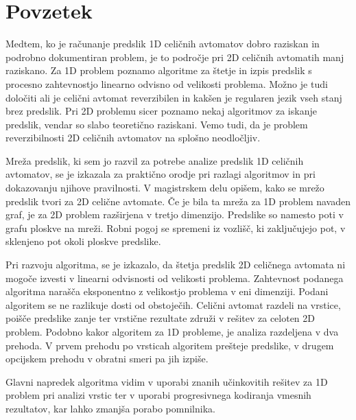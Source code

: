 \documentclass[12pt,a4paper,openany,twoside]{book}
\begin{document}

\clearpage{\pagestyle{empty}\cleardoublepage}


\setcounter{page}{1}

\chapter*{Povzetek}


Medtem, ko je računanje predslik 1D celičnih avtomatov dobro raziskan in
podrobno dokumentiran problem, je to področje pri 2D celičnih avtomatih manj raziskano.
Za 1D problem poznamo algoritme za štetje in izpis predslik s
procesno zahtevnostjo linearno odvisno od velikosti problema.
Možno je tudi določiti ali je celični avtomat reverzibilen in
kakšen je regularen jezik vseh stanj brez predslik.
Pri 2D problemu sicer poznamo nekaj algoritmov za iskanje predslik,
vendar so slabo teoretično raziskani.
Vemo tudi, da je problem reverzibilnosti 2D celičnih avtomatov na splošno neodločljiv.

Mreža predslik, ki sem jo razvil za potrebe analize predslik 1D celičnih avtomatov,
se je izkazala za praktično orodje pri razlagi algoritmov in pri dokazovanju njihove pravilnosti.
V magistrskem delu opišem, kako se mrežo predslik tvori za 2D celične avtomate.
Če je bila ta mreža za 1D problem navaden graf, je za 2D problem razširjena v tretjo dimenzijo.
Predslike so namesto poti v grafu ploskve na mreži.
Robni pogoj se spremeni iz vozlišč, ki zaključujejo pot,
v sklenjeno pot okoli ploskve predslike.

Pri razvoju algoritma, se je izkazalo, da štetja predslik 2D celičnega avtomata
ni mogoče izvesti v linearni odvisnosti od velikosti problema.
Zahtevnost podanega algoritma narašča eksponentno z velikostjo problema v eni dimenziji.
Podani algoritem se ne razlikuje dosti od obstoječih.
Celični avtomat razdeli na vrstice, poišče predslike zanje
ter vrstične rezultate združi v rešitev za celoten 2D problem.
Podobno kakor algoritem za 1D probleme, je analiza razdeljena v dva prehoda.
V prvem prehodu po vrsticah algoritem prešteje predslike,
v drugem opcijskem prehodu v obratni smeri pa jih izpiše.

Glavni napredek algoritma vidim v uporabi znanih učinkovitih rešitev za 1D problem pri analizi vrstic ter
v uporabi progresivnega kodiranja vmesnih rezultatov, kar lahko zmanjša porabo pomnilnika.
\end{document}
